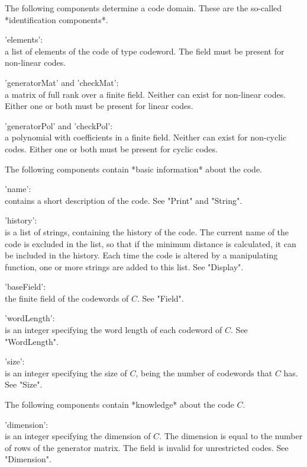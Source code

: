 The following components determine a code domain. These are the so-called
*identification components*.

'elements': \\
        a list of elements  of the code  of type codeword. The field must
        be present for non-linear codes.

'generatorMat' and 'checkMat': \\
        a matrix of full rank over a finite field.  Neither can exist for
        non-linear codes.  Either one or both  must be present for linear
        codes.

'generatorPol' and 'checkPol': \\
        a polynomial with  coefficients  in a  finite field.  Neither can
        exist  for non-cyclic codes. Either  one or both  must be present
        for cyclic codes.

The following components contain *basic information* about the code.

'name': \\
        contains    a short description  of   the  code. See "Print"  and
        "String".

'history': \\
        is a list  of strings, containing  the  history of the code.  The
        current name of the code is excluded in  the list, so that if the
        minimum distance is   calculated,  it  can  be  included  in  the
        history.  Each  time  the code   is   altered by  a  manipulating
        function,  one  or more strings   are  added to  this  list.  See
        "Display".

'baseField': \\
        the finite field of the codewords of $C$. See "Field".

'wordLength': \\
        is an integer specifying the word length of each codeword of $C$.
        See "WordLength".

'size': \\
        is an integer  specifying the  size of $C$,  being the  number of
        codewords that $C$ has. See "Size".

The following components contain *knowledge* about the code $C$.

'dimension': \\
        is an  integer specifying the  dimension of $C$. The dimension is
        equal to the number of rows of the generator matrix. The field is
        invalid for unrestricted codes. See "Dimension".

